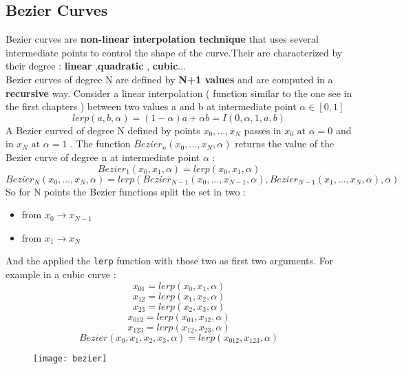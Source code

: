 \subsection{Bezier Curves}
Bezier curves are \textbf{non-linear interpolation technique} that uses several intermediate points to control the shape of the curve.Their are characterized by their degree : \textbf{linear} ,\textbf{quadratic} , \textbf{cubic}...\\
Bezier curves of degree N are defined by \textbf{N+1 values} and are computed in a \textbf{recursive} way. Consider a  linear interpolation ( function similar to the one see in the first chapters ) between two values a and b at intermediate point $\alpha \in [0,1]$ $$ lerp(a,b,\alpha )=  (1-\alpha)a+\alpha b = I(0,\alpha,1,a,b )$$
A Bezier curved of degree N defined by points $x_0,...,x_N$ passes in $x_0 \text{ at } \alpha =0 $ and in $x_N \text{ at } \alpha =1$ . The function $Bezier_n(x_0,...,x_N,\alpha)$ returns the value of the Bezier curve of degree n at intermediate point $\alpha$ :
\[
\boxed{Bezier_1(x_0,x_1,\alpha)=lerp(x_0,x_1,\alpha)}
\]
\[
\boxed{Bezier_N(x_0,...,x_N,\alpha)= lerp(Bezier_{N-1}(x_0,...,x_{N-1},\alpha),Bezier_{N-1}(x_1,...,x_{N},\alpha),\alpha) }
\]
So for N points the Bezier functions split the set in two :
\begin{itemize}
\item from $x_0 \to x_{N-1}$
\item from $x_1 \to x_{N}$ 
\end{itemize}
And the applied the \texttt{lerp} function with those two as first two arguments.
For example in a cubic curve : 
$$ x_{01} = lerp(x_0,x_1,\alpha)$$
$$ x_{12} = lerp(x_1,x_2,\alpha)$$
$$ x_{23} = lerp(x_2,x_3,\alpha)$$
$$ x_{012} = lerp(x_{01},x_{12},\alpha)$$
$$ x_{123} = lerp(x_{12},x_{23},\alpha)$$
$$ Bezier(x_0,x_1,x_2,x_3,\alpha) = lerp(x_{012},x_{123},\alpha)$$
 \begin{figure}[H]
 \centering
 \texttt{[image: bezier]} 
 \end{figure}